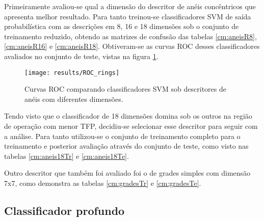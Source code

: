 Primeiramente avaliou-se qual a dimensão do descritor de anéis concêntricos que apresenta melhor resultado. Para tanto treinou-se classificadores SVM de saída probabilística com as descrições em 8, 16 e 18 dimensões sob o conjunto de treinamento reduzido, obtendo as matrizes de confusão das tabelas \ref{cm:aneisR8}, \ref{cm:aneisR16} e \ref{cm:aneisR18}. Obtiveram-se as curvas ROC desses classificadores avaliados no conjunto de teste, vistas na figura \ref{fig:roc-rings}. 

\begin{table}[h!]
\end{table}

\begin{figure}[h]
\centering
\texttt{[image: results/ROC\_rings]}
\caption{Curvas ROC comparando classificadores SVM sob descritores de anéis com diferentes dimensões.}
\label{fig:roc-rings}
\end{figure}

Tendo visto que o classificador de 18 dimensões domina sob os outros na região de operação com menor TFP, decidiu-se selecionar esse descritor para seguir com a análise. Para tanto utilizou-se o conjunto de treinamento completo para o treinamento e posterior avaliação através do conjunto de teste, como visto nas tabelas \ref{cm:aneis18Tr} e \ref{cm:aneis18Te}.

\begin{table}[h!]
\end{table}

Outro descritor que também foi avaliado foi o de grades simples com dimensão 7x7, como demonstra as tabelas \ref{cm:gradesTr} e \ref{cm:gradesTe}.

\begin{table}[h]
\end{table}

\subsection{Classificador profundo}

